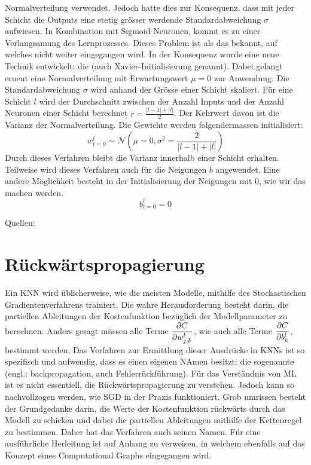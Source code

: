 Normalverteilung verwendet. Jedoch hatte dies zur Konsequenz, dass mit jeder Schicht die
Outputs eine stetig grösser werdende Standardabweichung $\sigma$ aufwiesen.
In Kombination mit Sigmoid-Neuronen, kommt es zu einer Verlangsamung des
Lernprozesses. Dieses Problem ist als das  bekannt,
auf welches nicht weiter eingegangen wird.
\para{}
In der Konsequenz wurde eine neue Technik entwickelt: die 
(auch Xavier-Initialisierung genannt). Dabei gelangt erneut eine Normalverteilung
mit Erwartungswert $\mu = 0$ zur Anwendung. Die Standardabweichung $\sigma$ wird
anhand der Grösse einer Schicht skaliert.
Für eine Schicht $l$ wird der Durchschnitt zwischen der Anzahl Inputs
und der Anzahl Neuronen einer Schicht berechnet $r = \frac{|l-1| + |l|}{2}$. Der Kehrwert
davon ist die Varianz der Normalverteilung.
Die Gewichte werden folgendermassen initialisiert:
\begin{equation}
  w_{t=0}^l \sim \mathcal{N}\left(\mu = 0, \sigma^2 = \frac{2}{|l-1| + |l|}\right)
\end{equation}
Durch dieses Verfahren bleibt die Varianz innerhalb einer Schicht erhalten.
Teilweise wird dieses Verfahren auch für die Neigungen $b$ angewendet. Eine
andere Möglichkeit besteht in der Initialisierung der Neigungen mit 0, wie wir
das machen werden.
\begin{equation}
  b_{t=0}^l = 0
\end{equation}

\para{}
Quellen: \cite{wiki:normal_distribution} \cite{Nielsen} \cite{book:hands-on}

\section{Rückwärtspropagierung}\label{sec:backpropagation}
Ein KNN wird üblicherweise, wie die meisten Modelle, mithilfe des Stochastischen
Gradientenverfahrens trainiert.
Die wahre Herausforderung besteht darin, die partiellen Ableitungen der
Kostenfunktion bezüglich der Modellparameter zu berechnen.
Anders gesagt müssen alle Terme
$\displaystyle\frac{\partial C}{\partial w_{j,k}^l}$, wie auch alle Terme $\displaystyle\frac{\partial C}{\partial b_k^l}$,
bestimmt werden.
Das Verfahren zur Ermittlung dieser Ausdrücke in KNNs ist so spezifisch und aufwendig,
dass es einen eigenen NAmen besitzt: die sogenannte  (engl.: backpropagation, auch
Fehlerrückführung).
\para{}
Für das Verständnis von ML ist es nicht essentiell, die Rückwärtspropagierung zu
verstehen. Jedoch kann so nachvollzogen werden, wie SGD in der Praxis funktioniert.
Grob umrissen besteht der Grundgedanke darin, die Werte der Kostenfunktion
rückwärts durch das Modell zu schicken und dabei die partiellen Ableitungen
mithilfe der Kettenregel zu bestimmen. Daher hat das Verfahren auch seinen Namen.
\para{}
Für eine ausführliche Herleitung ist auf Anhang
 zu verweisen, in welchem ebenfalls auf das Konzept eines
Computational Graphs eingegangen wird.

